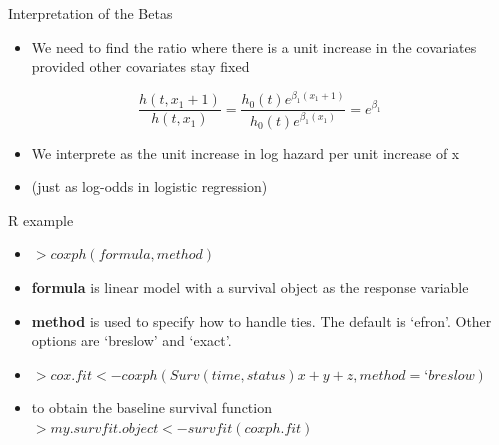 \documentclass[ignorenonframetext,]{beamer}
\begin{document}
\begin{frame}{Interpretation of the Betas}

\begin{itemize}
\itemsep1pt\parskip0pt
\item
  We need to find the ratio where there is a unit increase in the
  covariates provided other covariates stay fixed
\end{itemize}

\[
\frac{h(t,x_1+1)}{h(t,x_1)} = \frac{h_0(t)e^{\beta_1(x_1+1)}}{h_0(t)e^{\beta_1(x_1)}} = e^{\beta_1}
\]

\begin{itemize}
\itemsep1pt\parskip0pt
\item
  We interprete as the unit increase in log hazard per unit increase of
  x
\item
  (just as log-odds in logistic regression)
\end{itemize}

\end{frame}

\begin{frame}{R example}

\begin{itemize}
\itemsep1pt\parskip0pt
\item
  \(> coxph(formula, method)\)
\item
  \textbf{formula} is linear model with a survival object as the
  response variable
\item
  \textbf{method} is used to specify how to handle ties. The default is
  `efron'. Other options are `breslow' and `exact'.
\item
  \(> cox.fit < -coxph(Surv(time, status) x+y+z, method =‘breslow)\)
\item
  to obtain the baseline survival function
  \(> my.survfit.object <- survfit(coxph.fit)\)
\end{itemize}

\end{frame}
\end{document}
